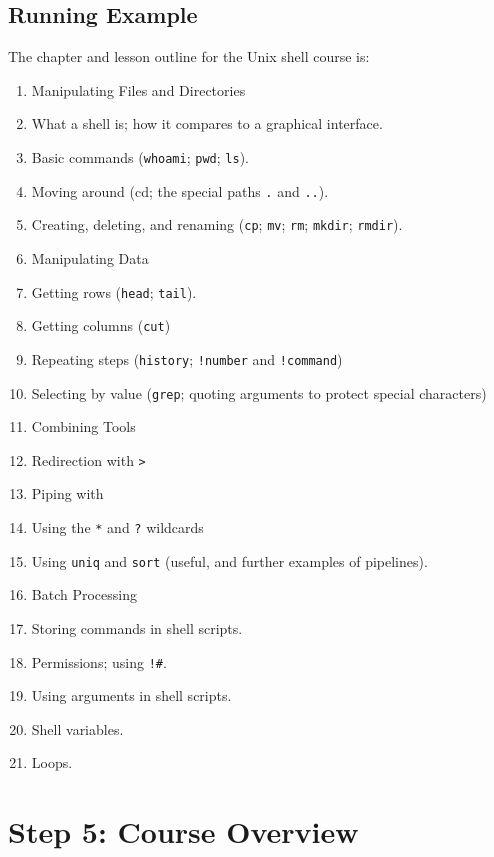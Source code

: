\documentclass[10pt,statementpaper]{memoir}
\providecommand{\tightlist}{%
  \setlength{\itemsep}{0pt}\setlength{\parskip}{0pt}}
\begin{document}
\subsection{Running Example}\label{running-example-3}

The chapter and lesson outline for the Unix shell course is:

\begin{enumerate}
\def\labelenumi{\arabic{enumi}.}
\tightlist
\item
  Manipulating Files and Directories
\item
  What a shell is; how it compares to a graphical interface.
\item
  Basic commands (\texttt{whoami}; \texttt{pwd}; \texttt{ls}).
\item
  Moving around (cd; the special paths \texttt{.} and \texttt{..}).
\item
  Creating, deleting, and renaming (\texttt{cp}; \texttt{mv};
  \texttt{rm}; \texttt{mkdir}; \texttt{rmdir}).
\item
  Manipulating Data
\item
  Getting rows (\texttt{head}; \texttt{tail}).
\item
  Getting columns (\texttt{cut})
\item
  Repeating steps (\texttt{history}; \texttt{!number} and
  \texttt{!command})
\item
  Selecting by value (\texttt{grep}; quoting arguments to protect
  special characters)
\item
  Combining Tools
\item
  Redirection with \texttt{\textgreater{}}
\item
  Piping with \texttt{\textbar{}}
\item
  Using the \texttt{*} and \texttt{?} wildcards
\item
  Using \texttt{uniq} and \texttt{sort} (useful, and further examples of
  pipelines).
\item
  Batch Processing
\item
  Storing commands in shell scripts.
\item
  Permissions; using \texttt{!\#}.
\item
  Using arguments in shell scripts.
\item
  Shell variables.
\item
  Loops.
\end{enumerate}

\section{Step 5: Course Overview}\label{step-5-course-overview}
\end{document}
